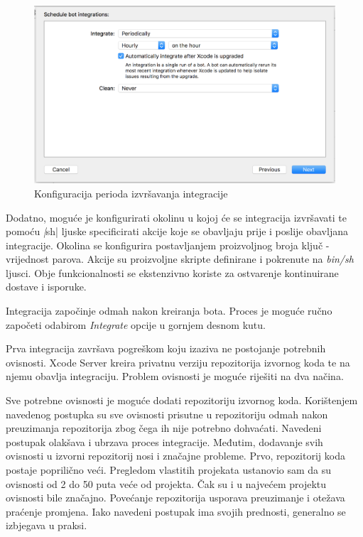 \documentclass[times, utf8, diplomski, numeric]{fer}
\begin{document}
\begin{appendices}
\begin{figure}
    \centering
    \includegraphics[scale=0.5]{XcodeServerIntegrationPeriods}
    \caption{Konfiguracija perioda izvršavanja integracije}
    \label{fig:XcodeServerIntegrationPeriods}
\end{figure}

Dodatno, moguće je konfigurirati okolinu u kojoj će se integracija izvršavati te pomoću \textit|sh| ljuske specificirati akcije koje se obavljaju prije i poslije obavljana integracije. Okolina se konfigurira postavljanjem proizvoljnog broja ključ - vrijednost parova. Akcije su proizvoljne skripte definirane i pokrenute na \textit{bin/sh} ljusci. Obje funkcionalnosti se ekstenzivno koriste za ostvarenje kontinuirane dostave i isporuke.

Integracija započinje odmah nakon kreiranja bota. Proces je moguće ručno započeti odabirom \textit{Integrate} opcije u gornjem desnom kutu.

Prva integracija završava pogreškom koju izaziva ne postojanje potrebnih ovisnosti. Xcode Server kreira privatnu verziju repozitorija izvornog koda te na njemu obavlja integraciju. Problem ovisnosti je moguće riješiti na dva načina.

Sve potrebne ovisnosti je moguće dodati repozitoriju izvornog koda. Korištenjem navedenog postupka su sve ovisnosti prisutne u repozitoriju odmah nakon preuzimanja repozitorija zbog čega ih nije potrebno dohvaćati. Navedeni postupak olakšava i ubrzava proces integracije. Međutim, dodavanje svih ovisnosti u izvorni repozitorij nosi i značajne probleme. Prvo, repozitorij koda postaje poprilično veći. Pregledom vlastitih projekata ustanovio sam da su ovisnosti od 2 do 50 puta veće od projekta. Čak su i u najvećem projektu ovisnosti bile značajno. Povećanje repozitorija usporava preuzimanje i otežava praćenje promjena. Iako navedeni postupak ima svojih prednosti, generalno se izbjegava u praksi.


\end{appendices}
\end{document}
